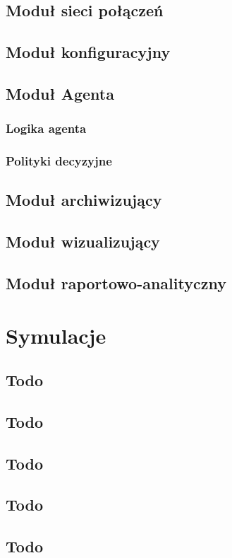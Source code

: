 \documentclass{article}
\begin{document}
\subsection{Moduł sieci połączeń}
\subsection{Moduł konfiguracyjny}
\subsection{Moduł Agenta}
\subsubsection{Logika agenta}
\subsubsection{Polityki decyzyjne}
\subsection{Moduł archiwizujący}
\subsection{Moduł wizualizujący}
\subsection{Moduł raportowo-analityczny}
\section{Symulacje \label{sec3}}
\subsection{Todo}
\subsection{Todo}
\subsection{Todo}
\subsection{Todo}
\subsection{Todo}
\end{document}
